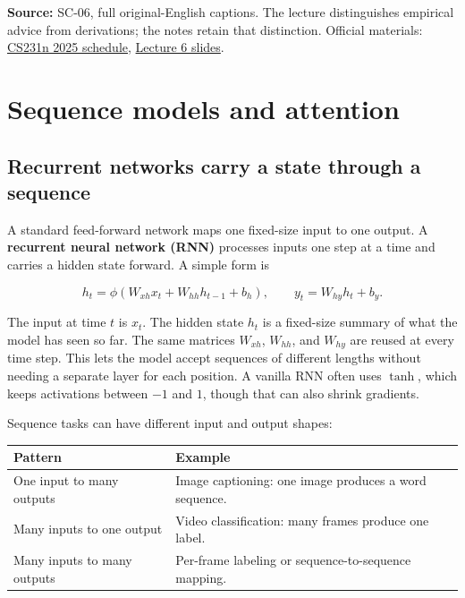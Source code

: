 \textbf{Source:} SC-06, full original-English captions. The lecture distinguishes empirical advice from derivations; the notes retain that distinction. Official materials: \href{https://cs231n.stanford.edu/2025/schedule.html}{CS231n 2025 schedule}, \href{https://cs231n.stanford.edu/slides/2025/lecture_6.pdf}{Lecture 6 slides}.

\section{Sequence models and attention}\label{04-visual-computing-ii-ch031-sequence-models-and-attention}

\hypertarget{04-visual-computing-ii-ch031-sequence-models-and-attention}{}

\subsection{Recurrent networks carry a state through a sequence}\label{04-visual-computing-ii-ch031-recurrent-networks-carry-a-state-through-a-sequence}

\hypertarget{04-visual-computing-ii-ch031-recurrent-networks-carry-a-state-through-a-sequence}{}

A standard feed-forward network maps one fixed-size input to one output. A \textbf{recurrent neural network (RNN)} processes inputs one step at a time and carries a hidden state forward. A simple form is

\[h_t=\phi(W_{xh}x_t+W_{hh}h_{t-1}+b_h),\qquad y_t=W_{hy}h_t+b_y.\]

The input at time \(t\) is \(x_t\). The hidden state \(h_t\) is a fixed-size summary of what the model has seen so far. The same matrices \(W_{xh}\), \(W_{hh}\), and \(W_{hy}\) are reused at every time step. This lets the model accept sequences of different lengths without needing a separate layer for each position. A vanilla RNN often uses \(\tanh\), which keeps activations between \(-1\) and \(1\), though that can also shrink gradients.

Sequence tasks can have different input and output shapes:

{\def\LTcaptype{none} %
\begin{longtable}[]{@{}
  >{\raggedright\arraybackslash}p{}
  >{\raggedright\arraybackslash}p{}@{}}
\toprule\noalign{}
\begin{minipage}[b]{\linewidth}\raggedright
Pattern
\end{minipage} & \begin{minipage}[b]{\linewidth}\raggedright
Example
\end{minipage} \\
\midrule\noalign{}
\endhead
\bottomrule\noalign{}
\endlastfoot
One input to many outputs & Image captioning: one image produces a word sequence. \\
Many inputs to one output & Video classification: many frames produce one label. \\
Many inputs to many outputs & Per-frame labeling or sequence-to-sequence mapping. \\
\end{longtable}
}

